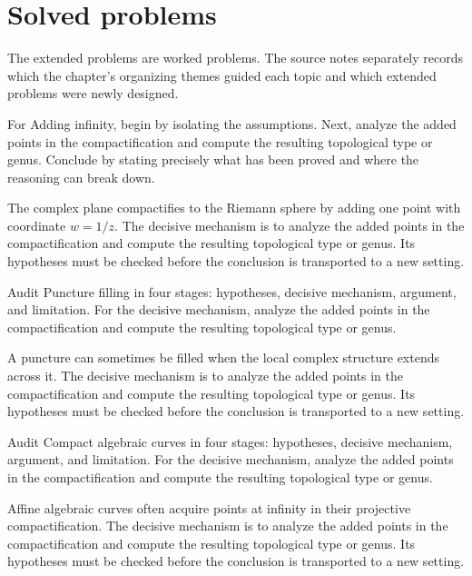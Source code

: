 \section{Solved problems}
The extended problems are worked problems. The source notes separately records which the chapter's organizing themes guided each topic and which extended problems were newly designed.

\begin{problem}\label{prob:iv26-problem-01}
For Adding infinity, begin by isolating the assumptions. Next, analyze the added points in the compactification and compute the resulting topological type or genus. Conclude by stating precisely what has been proved and where the reasoning can break down.
\end{problem}
\begin{solution}
The complex plane compactifies to the Riemann sphere by adding one point with coordinate $w=1/z$. The decisive mechanism is to analyze the added points in the compactification and compute the resulting topological type or genus. Its hypotheses must be checked before the conclusion is transported to a new setting.
\end{solution}

\begin{problem}\label{prob:iv26-problem-02}
Audit Puncture filling in four stages: hypotheses, decisive mechanism, argument, and limitation. For the decisive mechanism, analyze the added points in the compactification and compute the resulting topological type or genus.
\end{problem}
\begin{solution}
A puncture can sometimes be filled when the local complex structure extends across it. The decisive mechanism is to analyze the added points in the compactification and compute the resulting topological type or genus. Its hypotheses must be checked before the conclusion is transported to a new setting.
\end{solution}

\begin{problem}\label{prob:iv26-problem-03}
Audit Compact algebraic curves in four stages: hypotheses, decisive mechanism, argument, and limitation. For the decisive mechanism, analyze the added points in the compactification and compute the resulting topological type or genus.
\end{problem}
\begin{solution}
Affine algebraic curves often acquire points at infinity in their projective compactification. The decisive mechanism is to analyze the added points in the compactification and compute the resulting topological type or genus. Its hypotheses must be checked before the conclusion is transported to a new setting.
\end{solution}

